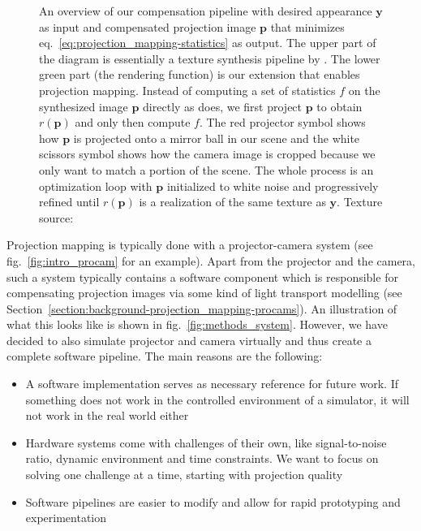 \begin{figure}[]
    \centering
    \hspace*{-8mm}\hspace*{8mm}
    \caption{An overview of our compensation pipeline with desired appearance \(\bm{y}\) as input and compensated projection image \(\bm{p}\) that minimizes eq.~\ref{eq:projection_mapping-statistics} as output. The upper part of the diagram is essentially a texture synthesis pipeline by \citet{Gatys2015}. The lower green part (the rendering function) is our extension that enables projection mapping. Instead of computing a set of statistics \(f\) on the synthesized image \(\bm{p}\) directly as \citet{Gatys2015} does, we first project \(\bm{p}\) to obtain \(r(\bm{p})\) and only then compute \(f\). The red projector symbol shows how \(\bm{p}\) is projected onto a mirror ball in our scene and the white scissors symbol shows how the camera image is cropped because we only want to match a portion of the scene. The whole process is an optimization loop with \(\bm{p}\) initialized to white noise and progressively refined until \(r(\bm{p})\) is a realization of the same texture as \(\bm{y}\). Texture source: \citet{Pixar128}}
    \label{fig:methods_pipeline}
\end{figure}

Projection mapping is typically done with a projector-camera system (see fig.~\ref{fig:intro_procam} for an example). Apart from the projector and the camera, such a system typically contains a software component which is responsible for compensating projection images via some kind of light transport modelling (see Section~\ref{section:background-projection_mapping-procams}). An illustration of what this looks like is shown in fig.~\ref{fig:methods_system}. However, we have decided to also simulate projector and camera virtually and thus create a complete software pipeline. The main reasons are the following:

\begin{itemize}
    \item A software implementation serves as necessary reference for future work. If something does not work in the controlled environment of a simulator, it will not work in the real world either
    \item Hardware systems come with challenges of their own, like signal-to-noise ratio, dynamic environment and time constraints. We want to focus on solving one challenge at a time, starting with projection quality
    \item Software pipelines are easier to modify and allow for rapid prototyping and experimentation
\end{itemize}

